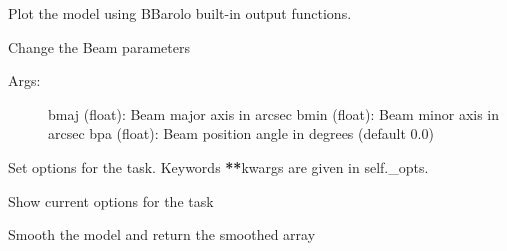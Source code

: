 \documentclass[letterpaper,10pt,english]{sphinxmanual}
\begin{document}
\begin{fulllineitems}

\begin{fulllineitems}
\label{\detokenize{pybb_api:pyBBarolo.pyBBarolo.FitMod3D.plot_model}}
Plot the model using BBarolo built-in output functions.

\end{fulllineitems}


\begin{fulllineitems}
\label{\detokenize{pybb_api:pyBBarolo.pyBBarolo.FitMod3D.set_beam}}
Change the Beam parameters
\begin{description}
\item[{Args:}] \leavevmode
bmaj (float): Beam major axis in arcsec
bmin (float): Beam minor axis in arcsec
bpa  (float): Beam position angle in degrees (default 0.0)

\end{description}

\end{fulllineitems}


\begin{fulllineitems}
\label{\detokenize{pybb_api:pyBBarolo.pyBBarolo.FitMod3D.set_options}}
Set options for the task. Keywords {\color{red}\bfseries{}**}kwargs are given in self.\_opts.

\end{fulllineitems}


\begin{fulllineitems}
\label{\detokenize{pybb_api:pyBBarolo.pyBBarolo.FitMod3D.show_options}}
Show current options for the task

\end{fulllineitems}


\begin{fulllineitems}
\label{\detokenize{pybb_api:pyBBarolo.pyBBarolo.FitMod3D.smooth}}
Smooth the model and return the smoothed array


\end{fulllineitems}
\end{fulllineitems}
\end{document}
